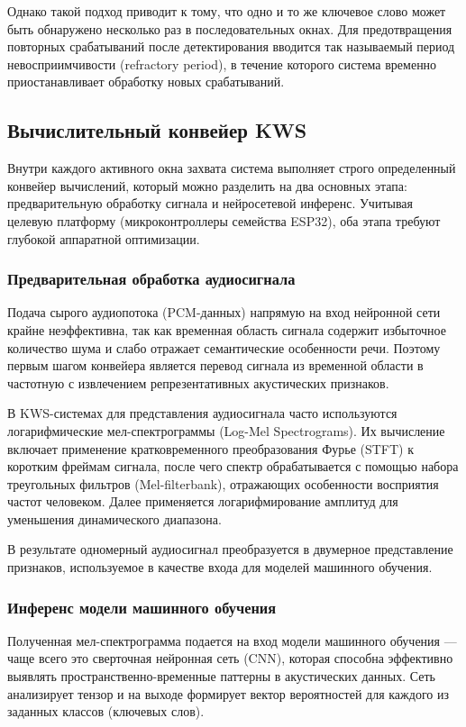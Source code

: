 Однако такой подход приводит к тому, что одно и то же ключевое слово может быть обнаружено несколько раз в последовательных окнах. Для предотвращения повторных срабатываний после детектирования вводится так называемый период невосприимчивости (refractory period), в течение которого система временно приостанавливает обработку новых срабатываний.\cite{López-Espejo}

\subsection{Вычислительный конвейер KWS}

Внутри каждого активного окна захвата система выполняет строго определенный конвейер вычислений, который можно разделить на два основных этапа: предварительную обработку сигнала и нейросетевой инференс. Учитывая целевую платформу (микроконтроллеры семейства ESP32), оба этапа требуют глубокой аппаратной оптимизации.

\subsubsection{Предварительная обработка аудиосигнала}
Подача сырого аудиопотока (PCM-данных) напрямую на вход нейронной сети крайне неэффективна, так как временная область сигнала содержит избыточное количество шума и слабо отражает семантические особенности речи\cite{Palaz2015}. Поэтому первым шагом конвейера является перевод сигнала из временной области в частотную с извлечением репрезентативных акустических признаков.

В KWS-системах для представления аудиосигнала часто используются логарифмические мел-спектрограммы (Log-Mel Spectrograms). Их вычисление включает применение кратковременного преобразования Фурье (STFT) к коротким фреймам сигнала, после чего спектр обрабатывается с помощью набора треугольных фильтров (Mel-filterbank), отражающих особенности восприятия частот человеком. Далее применяется логарифмирование амплитуд для уменьшения динамического диапазона.\cite{warden2019tinyml}

В результате одномерный аудиосигнал преобразуется в двумерное представление признаков, используемое в качестве входа для моделей машинного обучения.

\subsubsection{Инференс модели машинного обучения}

Полученная мел-спектрограмма подается на вход модели машинного обучения — чаще всего это сверточная нейронная сеть (CNN), которая способна эффективно выявлять пространственно-временные паттерны в акустических данных. Сеть анализирует тензор и на выходе формирует вектор вероятностей для каждого из заданных классов (ключевых слов). \cite{Li2022}

